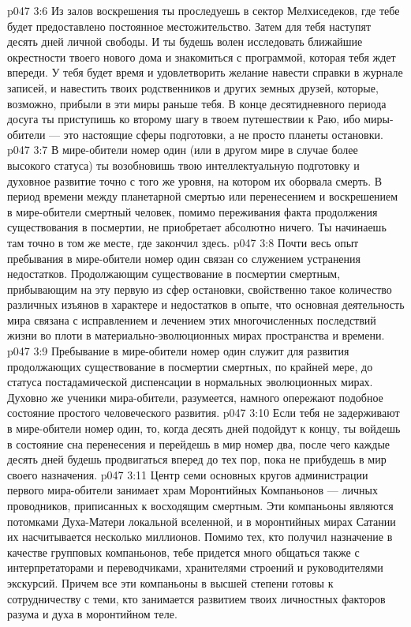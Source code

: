 \vs p047 3:6 \pc Из залов воскрешения ты проследуешь в сектор Мелхиседеков, где тебе будет предоставлено постоянное местожительство. Затем для тебя наступят десять дней личной свободы. И ты будешь волен исследовать ближайшие окрестности твоего нового дома и знакомиться с программой, которая тебя ждет впереди. У тебя будет время и удовлетворить желание навести справки в журнале записей, и навестить твоих родственников и других земных друзей, которые, возможно, прибыли в эти миры раньше тебя. В конце десятидневного периода досуга ты приступишь ко второму шагу в твоем путешествии к Раю, ибо миры\hyp{}обители --- это настоящие сферы подготовки, а не просто планеты остановки.
\vs p047 3:7 \pc В мире\hyp{}обители номер один (или в другом мире в случае более высокого статуса) ты возобновишь твою интеллектуальную подготовку и духовное развитие точно с того же уровня, на котором их оборвала смерть. В период времени между планетарной смертью или перенесением и воскрешением в мире\hyp{}обители смертный человек, помимо переживания факта продолжения существования в посмертии, не приобретает абсолютно ничего. Ты начинаешь там точно в том же месте, где закончил здесь.
\vs p047 3:8 Почти весь опыт пребывания в мире\hyp{}обители номер один связан со служением устранения недостатков. Продолжающим существование в посмертии смертным, прибывающим на эту первую из сфер остановки, свойственно такое количество различных изъянов в характере и недостатков в опыте, что основная деятельность мира связана с исправлением и лечением этих многочисленных последствий жизни во плоти в материально\hyp{}эволюционных мирах пространства и времени.
\vs p047 3:9 Пребывание в мире\hyp{}обители номер один служит для развития продолжающих существование в посмертии смертных, по крайней мере, до статуса постадамической диспенсации в нормальных эволюционных мирах. Духовно же ученики мира\hyp{}обители, разумеется, намного опережают подобное состояние простого человеческого развития.
\vs p047 3:10 Если тебя не задерживают в мире\hyp{}обители номер один, то, когда десять дней подойдут к концу, ты войдешь в состояние сна перенесения и перейдешь в мир номер два, после чего каждые десять дней будешь продвигаться вперед до тех пор, пока не прибудешь в мир своего назначения.
\vs p047 3:11 \pc Центр семи основных кругов администрации первого мира\hyp{}обители занимает храм Моронтийных Компаньонов --- личных проводников, приписанных к восходящим смертным. Эти компаньоны являются потомками Духа\hyp{}Матери локальной вселенной, и в моронтийных мирах Сатании их насчитывается несколько миллионов. Помимо тех, кто получил назначение в качестве групповых компаньонов, тебе придется много общаться также с интерпретаторами и переводчиками, хранителями строений и руководителями экскурсий. Причем все эти компаньоны в высшей степени готовы к сотрудничеству с теми, кто занимается развитием твоих личностных факторов разума и духа в моронтийном теле.
